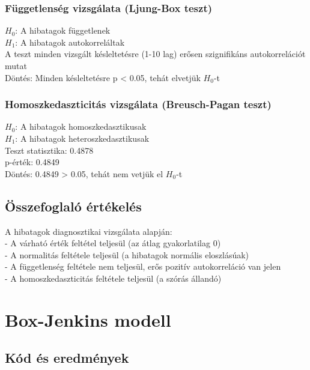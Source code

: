 \documentclass[11pt]{article}
\begin{document}
\subsubsection{Függetlenség vizsgálata (Ljung-Box
teszt)}\label{fuxfcggetlensuxe9g-vizsguxe1lata-ljung-box-teszt}

$H_0$: A hibatagok függetlenek\\
$H_1$: A hibatagok autokorreláltak\\
A teszt minden vizsgált késleltetésre (1-10 lag) erősen szignifikáns
autokorrelációt mutat\\
Döntés: Minden késleltetésre p \textless{} 0.05, tehát elvetjük $H_0$-t

\subsubsection{Homoszkedaszticitás vizsgálata (Breusch-Pagan
teszt)}\label{homoszkedaszticituxe1s-vizsguxe1lata-breusch-pagan-teszt}

$H_0$: A hibatagok homoszkedasztikusak\\
$H_1$: A hibatagok heteroszkedasztikusak\\
Teszt statisztika: 0.4878\\
p-érték: 0.4849\\
Döntés: 0.4849 \textgreater{} 0.05, tehát nem vetjük el $H_0$-t

\subsection{Összefoglaló
értékelés}\label{uxf6sszefoglaluxf3-uxe9rtuxe9keluxe9s}

A hibatagok diagnosztikai vizsgálata alapján:\\
- A várható érték feltétel teljesül (az átlag gyakorlatilag 0)\\
- A normalitás feltétele teljesül (a hibatagok normális eloszlásúak)\\
- A függetlenség feltétele nem teljesül, erős pozitív autokorreláció van
jelen\\
- A homoszkedaszticitás feltétele teljesül (a szórás állandó)

    \section{Box-Jenkins modell}\label{box-jenkins-modell}

\subsection{Kód és eredmények}\label{kuxf3d-uxe9s-eredmuxe9nyek}
\end{document}
